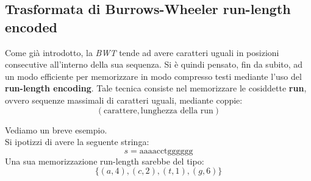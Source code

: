 \subsection{Trasformata di Burrows-Wheeler run-length encoded}
Come già introdotto, la \textit{BWT} tende ad avere caratteri uguali in
posizioni consecutive all'interno della sua sequenza. Si è quindi 
pensato, fin da subito, ad un modo efficiente per memorizzare in modo compresso
testi mediante l'uso del \textbf{run-length encoding}. Tale tecnica consiste nel
memorizzare le cosiddette \textbf{run}, ovvero sequenze massimali di caratteri
uguali, mediante coppie: 
\[(\mbox{carattere}, \mbox{lunghezza della run})\]
\begin{esempio}
  Vediamo un breve esempio.\\
  Si ipotizzi di avere la seguente stringa:
  \[s=\mbox{aaaacctgggggg}\]
  Una sua memorizzazione run-length sarebbe del tipo:
  \[\{(a,4),(c,2),(t,1),(g,6)\}\]
\end{esempio}
